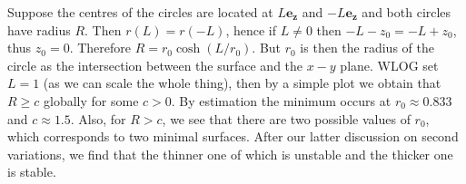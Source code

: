 \documentclass[a4paper]{article}
\begin{document}
\begin{example}
    Suppose the centres of the circles are located at $L\mathbf{e_z}$ and $-L\mathbf{e_z}$ and both circles have radius $R$.
    Then $r(L)=r(-L)$, hence if $L\neq 0$ then $-L-z_0=-L+z_0$, thus $z_0=0$.
    Therefore $R=r_0\cosh(L/r_0)$.
    But $r_0$ is then the radius of the circle as the intersection between the surface and the $x-y$ plane.
    WLOG set $L=1$ (as we can scale the whole thing), then by a simple plot we obtain that $R\ge c$ globally for some $c>0$.
    By estimation the minimum occurs at $r_0\approx 0.833$ and $c\approx 1.5$.
    Also, for $R>c$, we see that there are two possible values of $r_0$, which corresponds to two minimal surfaces.
    After our latter discussion on second variations, we find that the thinner one of which is unstable and the thicker one is stable.
\end{example}
\end{document}
